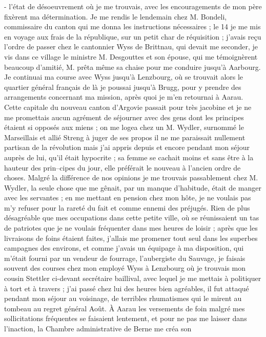 \documentclass[12pt]{article}
\begin{document}
 - l’état de désoeuvrement où je me trouvais,
avec les encouragements de mon père fixèrent ma détermination. Je me rendis le lendemain chez M.
Bondeli, commissaire du canton qui me donna les instructions nécessaires ; le 14 je me mis en voyage
aux frais de la république, sur un petit char de réquisition ; j’avais reçu l’ordre de passer chez
le cantonnier Wyss de Brittnau, qui devait me seconder, je vis dans ce village le ministre M.
Desgouttes et son épouse, qui me témoignèrent beaucoup d’amitié, M. prêta même sa chaise pour me
conduire jusqu’à Aarbourg. Je continuai ma course avec Wyss jusqu’à Lenzbourg, où se trouvait alors
le quartier général français de là je poussai jusqu’à Brugg, pour y prendre des arrangements
concernant ma mission, après quoi je m’en retournai à Aarau. Cette capitale du nouveau canton
d’Argovie passait pour très jacobine et je ne me promettais aucun agrément de séjourner avec des
gens dont les principes étaient si opposés aux miens ; on me logea chez un M. Wydler, surnommé le
Marseillais et allié Streng à juger de ses propos il ne me paraissait nullement partisan de la
révolution mais j’ai appris depuis et encore pendant mon séjour auprès de lui, qu’il était hypocrite
; sa femme se cachait moins et sans être à la hauteur des prin–cipes du jour, elle préférait le
nouveau à l’ancien ordre de choses. Malgré la différence de nos opinions je me trouvais passablement
chez M. Wydler, la seule chose que me gênait, par un manque d’habitude, était de manger avec les
servantes ; en me mettant en pension chez mon hôte, je ne voulais pas m’y refuser pour la rareté du
fait et comme ennemi des préjugés. Rien de plus désagréable que mes occupations dans cette petite
ville, où se réunissaient un tas de patriotes que je ne voulais fréquenter dans mes heures de loisir
; après que les livraisons de foins étaient faites, j’allais me promener tout seul dans les superbes
campagnes des environs, et comme j’avais un équipage à ma disposition, qui m’était fourni par un
vendeur de fourrage, l’aubergiste du Sauvage, je faisais souvent des courses chez mon employé Wyss à
Lenzbourg où je trouvais mon cousin Stettler ci-devant secrétaire baillival, avec lequel je me
mettais à politiquer à tort et à travers ; j’ai passé chez lui des heures bien agréables, il fut
attaqué pendant mon séjour au voisinage, de terribles rhumatismes qui le mirent au tombeau au regret
général Août. À Aarau les versements de foin malgré mes sollicitations fréquentes se faisaient
lentement, et pour ne pas me laisser dans l’inaction, la Chambre administrative de Berne me créa son
\end{document}
